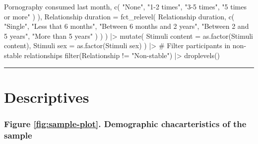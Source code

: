 \documentclass[
  bookmarksnumbered]{article}
\newenvironment{Shaded}{\begin{snugshade}}{\end{snugshade}}
\newcommand{\AttributeTok}[1]{\textcolor[rgb]{0.80,0.80,0.80}{#1}}
\newcommand{\CommentTok}[1]{\textcolor[rgb]{0.50,0.62,0.50}{#1}}
\newcommand{\FunctionTok}[1]{\textcolor[rgb]{0.94,0.94,0.56}{#1}}
\newcommand{\NormalTok}[1]{\textcolor[rgb]{0.80,0.80,0.80}{#1}}
\newcommand{\OtherTok}[1]{\textcolor[rgb]{0.94,0.94,0.56}{#1}}
\newcommand{\SpecialCharTok}[1]{\textcolor[rgb]{0.86,0.64,0.64}{#1}}
\newcommand{\StringTok}[1]{\textcolor[rgb]{0.80,0.58,0.58}{#1}}
\begin{document}
\begin{Shaded}
\begin{Highlighting}[]
      \StringTok{\textasciigrave{}}\AttributeTok{Pornography consumed last month}\StringTok{\textasciigrave{}}\NormalTok{,}
      \FunctionTok{c}\NormalTok{(}
        \StringTok{"None"}\NormalTok{, }\StringTok{"1{-}2 times"}\NormalTok{,}
        \StringTok{"3{-}5 times"}\NormalTok{, }\StringTok{"5 times or more"}
\NormalTok{      )}
\NormalTok{    ),}
    \StringTok{\textasciigrave{}}\AttributeTok{Relationship duration}\StringTok{\textasciigrave{}} \OtherTok{=} \FunctionTok{fct\_relevel}\NormalTok{(}
      \StringTok{\textasciigrave{}}\AttributeTok{Relationship duration}\StringTok{\textasciigrave{}}\NormalTok{,}
      \FunctionTok{c}\NormalTok{(}
        \StringTok{"Single"}\NormalTok{, }\StringTok{"Less that 6 months"}\NormalTok{,}
        \StringTok{"Between 6 months and 2 years"}\NormalTok{,}
        \StringTok{"Between 2 and 5 years"}\NormalTok{,}
        \StringTok{"More than 5 years"}
\NormalTok{      )}
\NormalTok{    )}
\NormalTok{  ) }\SpecialCharTok{|\textgreater{}}
  \FunctionTok{mutate}\NormalTok{(}
    \StringTok{\textasciigrave{}}\AttributeTok{Stimuli content}\StringTok{\textasciigrave{}} \OtherTok{=} \FunctionTok{as.factor}\NormalTok{(}\StringTok{\textasciigrave{}}\AttributeTok{Stimuli content}\StringTok{\textasciigrave{}}\NormalTok{),}
    \StringTok{\textasciigrave{}}\AttributeTok{Stimuli sex}\StringTok{\textasciigrave{}} \OtherTok{=} \FunctionTok{as.factor}\NormalTok{(}\StringTok{\textasciigrave{}}\AttributeTok{Stimuli sex}\StringTok{\textasciigrave{}}\NormalTok{)}
\NormalTok{  ) }\SpecialCharTok{|\textgreater{}}
  \CommentTok{\# Filter participants in non{-}stable relationships}
  \FunctionTok{filter}\NormalTok{(Relationship }\SpecialCharTok{!=} \StringTok{"Non{-}stable"}\NormalTok{) }\SpecialCharTok{|\textgreater{}}
  \FunctionTok{droplevels}\NormalTok{()}
\end{Highlighting}
\end{Shaded}

\begin{center}\rule{0.5\linewidth}{0.5pt}\end{center}

\section{Descriptives}\label{descriptives}

\subsubsection{Figure \ref{fig:sample-plot}. Demographic chacarteristics of the sample}\label{figure-reffigsample-plot.-demographic-chacarteristics-of-the-sample}
\end{document}
